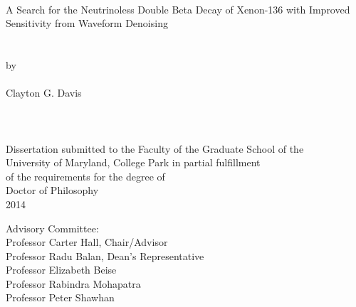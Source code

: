 
\thispagestyle{empty}
\hbox{\ }
\vspace{1in}
\renewcommand{\baselinestretch}{1}
\small\normalsize
\begin{center}

\large{{A Search for the Neutrinoless Double Beta Decay of Xenon-136 with Improved Sensitivity from Waveform Denoising}}\\
\ \\
\ \\
\large{by} \\
\ \\
\large{Clayton G. Davis}%
\ \\
\ \\
\ \\
\ \\
\normalsize
Dissertation submitted to the Faculty of the Graduate School of the \\
University of Maryland, College Park in partial fulfillment \\
of the requirements for the degree of \\
Doctor of Philosophy \\
2014
\end{center}

\vspace{7.5em}

\noindent Advisory Committee: \\
Professor Carter Hall, Chair/Advisor \\
Professor Radu Balan, Dean's Representative \\
Professor Elizabeth Beise \\
Professor Rabindra Mohapatra \\
Professor Peter Shawhan

